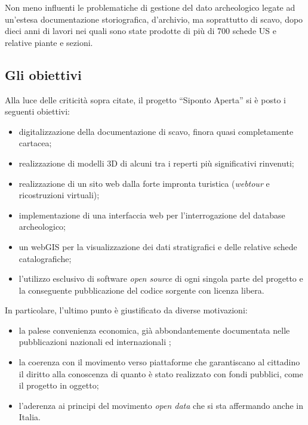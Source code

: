 \documentclass{paper}
\begin{document}
        Non meno influenti le problematiche di gestione del dato archeologico legate ad un'estesa documentazione storiografica, d'archivio, ma soprattutto di scavo, dopo dieci anni di lavori nei quali sono state prodotte di più di 700 schede US e relative piante e sezioni.

    \subsection{Gli obiettivi}

        Alla luce delle criticità sopra citate, il progetto ``Siponto Aperta'' si è posto i seguenti obiettivi:

        \begin{itemize}
            \item digitalizzazione della documentazione di scavo, finora quasi completamente cartacea;
            \item realizzazione di modelli 3D di alcuni tra i reperti più significativi rinvenuti;
            \item realizzazione di un sito web dalla forte impronta turistica (\textit{webtour} e ricostruzioni virtuali);
            \item implementazione di una interfaccia web per l'interrogazione del database archeologico;
            \item un webGIS per la visualizzazione dei dati stratigrafici e delle relative schede catalografiche;
            \item l'utilizzo esclusivo di software \textit{open source} di ogni singola parte del progetto e la conseguente pubblicazione del codice sorgente con licenza libera.
        \end{itemize}

        In particolare, l'ultimo punto è giustificato da diverse motivazioni:

        \begin{itemize}
            \item la palese convenienza economica, già abbondantemente documentata nelle pubblicazioni nazionali ed internazionali \cite{open-source-archeologia};
            \item la coerenza con il movimento verso piattaforme che garantiscano al cittadino il diritto alla conoscenza di quanto è stato realizzato con fondi pubblici, come il progetto in oggetto;
            \item l'aderenza ai principi del movimento \emph{open data} che si sta affermando anche in Italia.
        \end{itemize}
\end{document}
